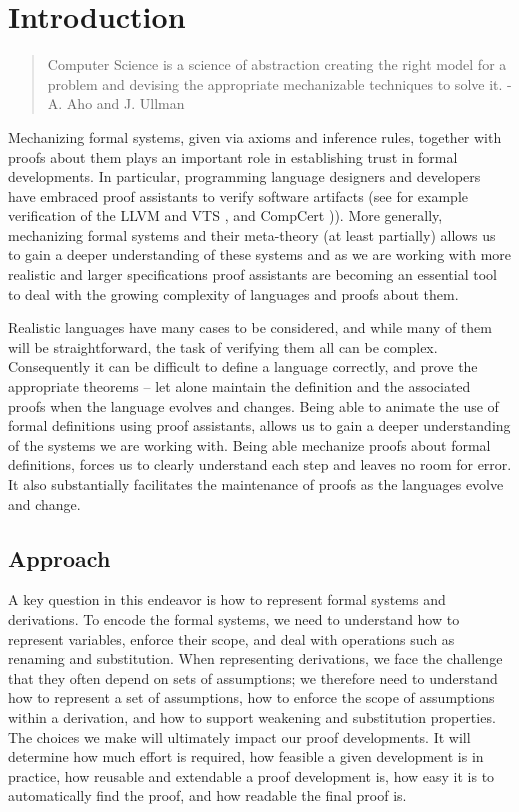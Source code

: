 \chapter{Introduction}
\begin{center}
  \begin{quote}
Computer Science is a science of abstraction 
creating the right model for a problem and
devising the appropriate mechanizable techniques
to solve it.
\hfill- A. Aho and J. Ullman    
  \end{quote}
\end{center}

Mechanizing formal systems, given via axioms and inference rules, together with
proofs about them plays an important role in establishing trust in
formal developments. In particular, programming language designers and
developers have embraced proof assistants to verify software artifacts (see for example verification of the LLVM
\citep{ZhaoNMZ12} and VTS \citep{Appel11}, and CompCert
\citep{Leroy-Compcert-CACM})). More generally,  mechanizing formal systems
and their meta-theory  (at least partially) allows us to gain a deeper
understanding of these systems and as we are working with more
realistic and larger specifications proof assistants are becoming an essential
tool to deal with the growing complexity of languages and proofs about
them. %

Realistic languages have many cases to be considered, and
while many of them will be straightforward, the task of verifying them
all can be complex. Consequently it can be difficult to define a language
correctly, and prove the appropriate theorems -- let alone maintain
the definition and the associated proofs when the language evolves and
changes.  Being able to animate the use of formal definitions using
proof assistants, allows us to gain a deeper understanding of the
systems we are working with. Being able mechanize proofs about formal
definitions, forces us to clearly understand each step and leaves no
room for error.  It also substantially facilitates the maintenance of
proofs as the languages evolve and change.


\section{Approach}

A key question in this endeavor is how to represent formal systems and
derivations. To encode the formal systems, we need to understand how
to represent variables, enforce their scope, and deal with operations
such as renaming and substitution. When representing derivations, we
face the challenge that they often depend on sets of assumptions; we
therefore need to understand how to represent a set of assumptions,
how to enforce the scope of assumptions within a derivation, and how
to support weakening and substitution properties. The choices we make
will ultimately  impact our proof developments. It will determine
how much effort is required, how feasible a given development is in
practice, how reusable and extendable a proof development is, how easy
it is to automatically find the proof, and how readable the final proof is.  

